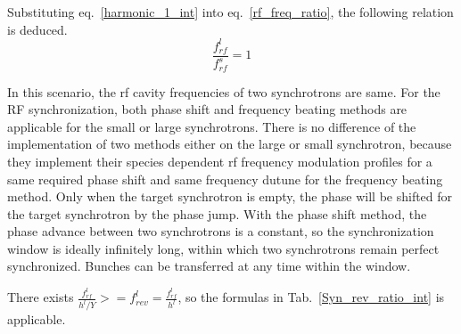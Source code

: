 Substituting eq.~\ref{harmonic_1_int} into eq.~\ref{rf_freq_ratio}, the following relation is deduced. 
\begin{equation} 
\frac{f_{rf}^{l}}{f_{rf}^{s}}= 1\label{frequency_same}
\end{equation}

In this scenario, the rf cavity frequencies of two synchrotrons are same. For the RF synchronization, both phase shift and frequency beating methods are applicable for the small or large synchrotrons. There is no difference of the implementation of two methods either on the large or small synchrotron, because they implement their species dependent rf frequency modulation profiles for a same required phase shift and same frequency dutune for the frequency beating method. Only when the target synchrotron is empty, the phase will be shifted for the target synchrotron by the phase jump. With the phase shift method, the phase advance between two synchrotrons is a constant, so the synchronization window is ideally infinitely long, within which two synchrotrons remain perfect synchronized. Bunches can be transferred at any time within the window.

There exists $\frac{f_{rf}^{l}}{h^l/Y}>=f_{rev}^{l}=\frac{f_{rf}^{l}}{h^l}$, so the formulas in Tab.~\ref{Syn_rev_ratio_int} is applicable.

